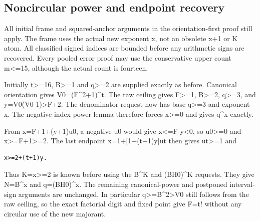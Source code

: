 \subsection{Noncircular power and endpoint recovery}



All initial frame and squared-anchor arguments in the orientation-first proof still apply. The frame uses the actual new exponent x, not an obsolete x+\allowbreak{}1 or K atom. All classified signed indices are bounded before any arithmetic signs are recovered. Every pooled error proof may use the conservative upper count m\textless{}\allowbreak{}=\allowbreak{}15, although the actual count is fourteen.



Initially t\textgreater{}\allowbreak{}=\allowbreak{}16, B\textgreater{}\allowbreak{}=\allowbreak{}1 and q\textgreater{}\allowbreak{}=\allowbreak{}2 are supplied exactly as before. Canonical orientation gives V0=\allowbreak{}(F\textasciicircum{}\allowbreak{}2+\allowbreak{}1)\textasciicircum{}\allowbreak{}t. The raw ceiling gives F\textgreater{}\allowbreak{}=\allowbreak{}1, B\textgreater{}\allowbreak{}=\allowbreak{}2, q\textgreater{}\allowbreak{}=\allowbreak{}3, and y=\allowbreak{}V0(V0-1)\textgreater{}\allowbreak{}F+\allowbreak{}2. The denominator request now has base q\textgreater{}\allowbreak{}=\allowbreak{}3 and exponent x. The negative-index power lemma therefore forces x\textgreater{}\allowbreak{}=\allowbreak{}0 and gives q\textasciicircum{}\allowbreak{}x exactly.



From x=\allowbreak{}F+\allowbreak{}1+\allowbreak{}(y+\allowbreak{}1)u0, a negative u0 would give x\textless{}\allowbreak{}=\allowbreak{}F-y\textless{}\allowbreak{}0, so u0\textgreater{}\allowbreak{}=\allowbreak{}0 and x\textgreater{}\allowbreak{}=\allowbreak{}F+\allowbreak{}1\textgreater{}\allowbreak{}=\allowbreak{}2. The last endpoint x=\allowbreak{}1+\allowbreak{}[1+\allowbreak{}(t+\allowbreak{}1)y]ut then gives ut\textgreater{}\allowbreak{}=\allowbreak{}1 and



\begin{verbatim}
x>=2+(t+1)y.
\end{verbatim}

Thus K=\allowbreak{}x\textgreater{}\allowbreak{}=\allowbreak{}2 is known before using the B\textasciicircum{}\allowbreak{}K and (B\textasteriskcentered{}\allowbreak{}H0)\textasciicircum{}\allowbreak{}K requests. They give N=\allowbreak{}B\textasciicircum{}\allowbreak{}x and q=\allowbreak{}(B\textasteriskcentered{}\allowbreak{}H0)\textasciicircum{}\allowbreak{}x. The remaining canonical-power and postponed interval-sign arguments are unchanged. In particular q\textgreater{}\allowbreak{}=\allowbreak{}B\textasciicircum{}\allowbreak{}2\textgreater{}\allowbreak{}V0 still follows from the raw ceiling, so the exact factorial digit and fixed point give F=\allowbreak{}t! without any circular use of the new majorant.



